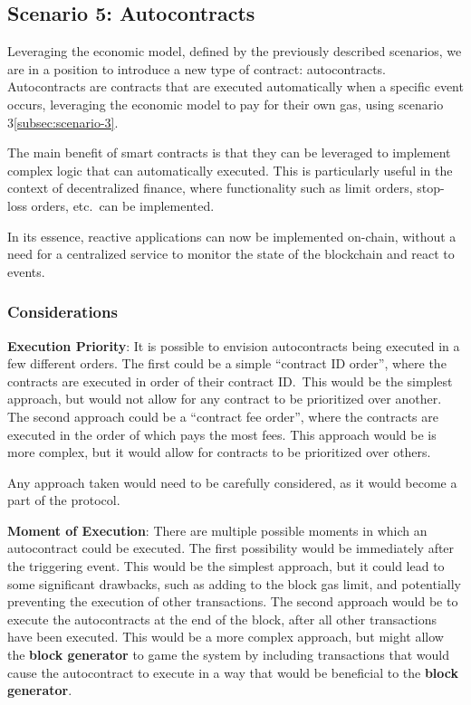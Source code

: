 \documentclass[twocolumn, nofootinbib]{revtex4-2} %
\newcommand{\emphasize}[1]{\textbf{#1}\xspace}
\newcommand{\blockgenerator}{\emphasize{block generator}}
\begin{document}
    \subsection*{Scenario 5: Autocontracts}\label{subsec:scenario-5}

    Leveraging the economic model, defined by the previously described scenarios,
    we are in a position to introduce a new type of contract: autocontracts.
    Autocontracts are contracts that are executed automatically when a specific
    event occurs, leveraging the economic model to pay for their own gas, using
    scenario 3\ref{subsec:scenario-3}.

    The main benefit of smart contracts is that they can be leveraged to implement
    complex logic that can automatically executed.
    This is particularly useful in the context of decentralized finance, where
    functionality such as limit orders, stop-loss orders, etc.\ can be implemented.

    In its essence, reactive applications can now be implemented on-chain, without
    a need for a centralized service to monitor the state of the blockchain and
    react to events.

    \subsubsection*{Considerations}\label{subsubsec:considerations}

    \textbf{Execution Priority}: It is possible to envision autocontracts being
    executed in a few different orders.
    The first could be a simple ``contract ID order'', where the contracts are
    executed in order of their contract ID.\
    This would be the simplest approach, but would not allow for any contract
    to be prioritized over another.
    The second approach could be a ``contract fee order'', where the contracts
    are executed in the order of which pays the most fees.
    This approach would be is more complex, but it would allow for contracts
    to be prioritized over others.

    Any approach taken would need to be carefully considered, as it would
    become a part of the protocol.

    \textbf{Moment of Execution}: There are multiple possible moments in which an
    autocontract could be executed.
    The first possibility would be immediately after the triggering event.
    This would be the simplest approach, but it could lead to some significant
    drawbacks, such as adding to the block gas limit, and potentially preventing the
    execution of other transactions.
    The second approach would be to execute the autocontracts at the end of the
    block, after all other transactions have been executed.
    This would be a more complex approach, but might allow the \blockgenerator to
    game the system by including transactions that would cause the autocontract to
    execute in a way that would be beneficial to the \blockgenerator.
\end{document}
